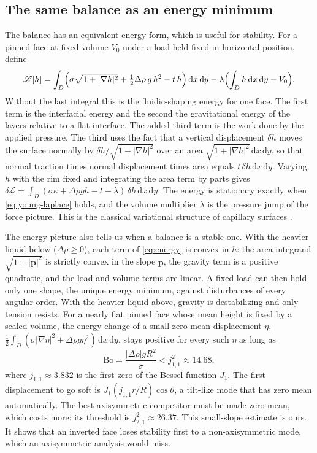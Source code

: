\documentclass[11pt,a4paper]{article}
\numberwithin{equation}{section}
\newcommand{\dd}{\,\mathrm d}
\begin{document}
\subsection{The same balance as an energy minimum}
The balance has an equivalent energy form, which is useful for stability. For
a pinned face at fixed volume $V_0$ under a load held fixed in horizontal
position, define
\begin{equation}
 \mathscr L[h]=\int_D\Bigl(\sigma\sqrt{1+|\nabla h|^2}
   +\tfrac12\Delta\rho\,g\,h^2-t\,h\Bigr)\dd x\dd y
   -\lambda\Bigl(\int_Dh\dd x\dd y-V_0\Bigr).
 \label{eq:energy}
\end{equation}
Without the last integral this is the fluidic-shaping energy
\cite[eq.~(1)]{frumkin2021} for one face. The first term is the interfacial
energy and the second the gravitational energy of the layers relative to a flat
interface. The added third term is the work done by the applied pressure. The third uses the fact that a vertical displacement $\delta h$ moves the
surface normally by $\delta h/\sqrt{1+|\nabla h|^2}$ over an area
$\sqrt{1+|\nabla h|^2}\dd x\dd y$, so that normal traction times normal
displacement times area equals $t\,\delta h\dd x\dd y$. Varying $h$ with the
rim fixed and integrating the area term by parts gives
$\delta\mathscr L=\int_D(\sigma\kappa+\Delta\rho gh-t-\lambda)\,\delta h\dd x\dd y$.
The energy is stationary exactly when \cref{eq:young-laplace} holds, and the
volume multiplier $\lambda$ is the pressure jump of the force picture. This is
the classical variational structure of capillary surfaces \cite{finn1986}.

The energy picture also tells us when a balance is a stable one. With the
heavier liquid below ($\Delta\rho\ge0$), each term of \cref{eq:energy} is
convex in $h$: the area integrand $\sqrt{1+|\bm p|^2}$ is strictly convex in
the slope $\bm p$, the gravity term is a positive quadratic, and the load and
volume terms are linear. A fixed load can then hold only one shape, the unique
energy minimum, against disturbances of every angular order. With the heavier
liquid above, gravity is destabilizing and only tension resists. For a nearly
flat pinned face whose mean height is fixed by a sealed volume, the energy
change of a small zero-mean displacement $\eta$,
$\tfrac12\int_D(\sigma|\nabla\eta|^2+\Delta\rho g\eta^2)\dd x\dd y$, stays
positive for every such $\eta$ as long as
\begin{equation}
 \mathrm{Bo}=\frac{|\Delta\rho|gR^2}{\sigma}<j_{1,1}^2\approx14.68,
 \label{eq:rt-threshold}
\end{equation}
where $j_{1,1}\approx3.832$ is the first zero of the Bessel function $J_1$. The
first displacement to go soft is $J_1(j_{1,1}r/R)\cos\theta$, a tilt-like mode
that has zero mean automatically. The best axisymmetric competitor must be
made zero-mean, which costs more: its threshold is $j_{2,1}^2\approx26.37$. This
small-slope estimate is ours. It shows that an inverted face loses stability
first to a non-axisymmetric mode, which an axisymmetric analysis would miss.
\end{document}
